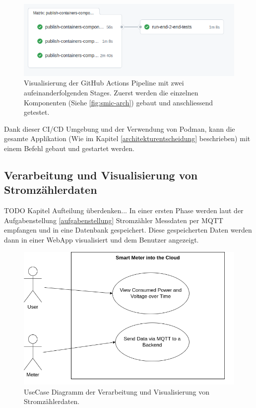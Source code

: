 \begin{figure}[h]
    \centering
    \includegraphics[width=1.0\textwidth]{gfx/ci-env}
    \caption{
        Visualisierung der GitHub Actions Pipeline mit zwei aufeinanderfolgenden Stages.
        Zuerst werden die einzelnen Komponenten (Siehe \ref{fig:smic-arch}) gebaut und
        anschliessend getestet.
    }
    \label{fig:ci-env}
\end{figure}

Dank dieser \ac{CI/CD} Umgebung und der Verwendung von Podman, kann die gesamte Applikation
(Wie im Kapitel \ref{architekturentscheidung} beschrieben) mit einem
Befehl gebaut und gestartet werden.

\subsection{Verarbeitung und Visualisierung von Stromzählerdaten}
TODO Kapitel Aufteilung überdenken...
In einer ersten Phase werden laut der Aufgabenstellung \ref{aufgabenstellung} Stromzähler
Messdaten per \ac{MQTT} empfangen und in eine Datenbank gespeichert.
Diese gespeicherten Daten werden dann in einer WebApp visualisiert und dem Benutzer
angezeigt.

\begin{figure}[h]
    \centering
    \includegraphics[width=1.0\textwidth]{gfx/usecase1}
    \caption{
        UseCase Diagramm der Verarbeitung und Visualisierung von Stromzählerdaten.
    }
    \label{fig:usecase1}
\end{figure}

